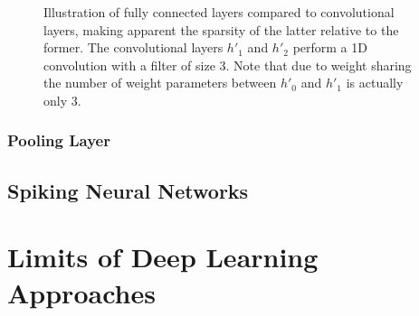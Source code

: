 \begin{figure}
    \centering
{}
\caption[Illustration of convolutional layers]{Illustration of fully connected layers compared to convolutional layers, making apparent the sparsity of the latter relative to the former. The convolutional layers $h'_1$ and $h'_2$ perform a 1D convolution with a filter of size $3$. Note that due to weight sharing the number of weight parameters between $h'_0$ and $h'_1$ is actually only $3$.}\label{fig:convolutional}
\end{figure}\noindent
\subsubsection{Pooling Layer}
\subsection{Spiking Neural Networks}
\section{Limits of Deep Learning Approaches}